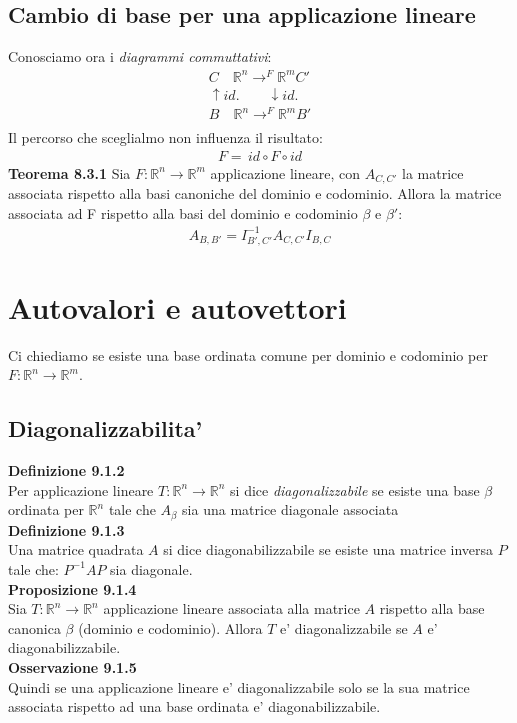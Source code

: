 \documentclass{article}
\begin{document}
\subsection{Cambio di base per una applicazione lineare}
Conosciamo ora i \textit{diagrammi commuttativi}:
\begin{align*}
  C \quad \mathbb{R}^n \to^F \mathbb{R}^m C'\\
  \uparrow id. \quad \quad \downarrow id. \\
  B \quad \mathbb{R}^n \to^F \mathbb{R}^m B'\\
\end{align*}
Il percorso che sceglialmo non influenza il risultato:
\begin{align*}
  F=\, id \circ F \circ id
\end{align*}
\textbf{Teorema 8.3.1}
Sia $F : \mathbb{R}^n \to \mathbb{R}^m$ applicazione lineare, con $A_{C,C'}$ la matrice associata rispetto alla basi canoniche del dominio e codominio. Allora la matrice associata ad F rispetto alla basi del dominio e codominio $\beta$ e $\beta'$:
\begin{align*}
  A_{B,B'}=I_{B',C'}^{-1}A_{C,C'}I_{B,C}
\end{align*}

\pagebreak
\section{Autovalori e autovettori}
Ci chiediamo se esiste una base ordinata comune per dominio e codominio per $F : \mathbb{R}^n \to \mathbb{R}^m$.
\subsection{Diagonalizzabilita'}
\textbf{Definizione 9.1.2} \\
Per applicazione lineare $T : \mathbb{R}^n \to \mathbb{R}^n$ si dice \textit{diagonalizzabile} se esiste una base $\beta$ ordinata per $\mathbb{R}^n$ tale che $A_\beta$ sia una matrice diagonale associata
\\
\textbf{Definizione 9.1.3}
\\ Una matrice quadrata $A$ si dice diagonabilizzabile se esiste una matrice inversa $P$ tale che: $P^{-1}AP$ sia diagonale.
\\
\textbf{Proposizione 9.1.4}
\\ Sia $T : \mathbb{R}^n \to \mathbb{R}^n$ applicazione lineare associata alla matrice $A$ rispetto alla base canonica $\beta$ (dominio e codominio). Allora $T$ e' diagonalizzabile se $A$ e' diagonabilizzabile.
\\
\textbf{Osservazione 9.1.5}
\\ Quindi se una applicazione lineare e' diagonalizzabile solo se la sua matrice associata rispetto ad una base ordinata e' diagonabilizzabile.
\end{document}
